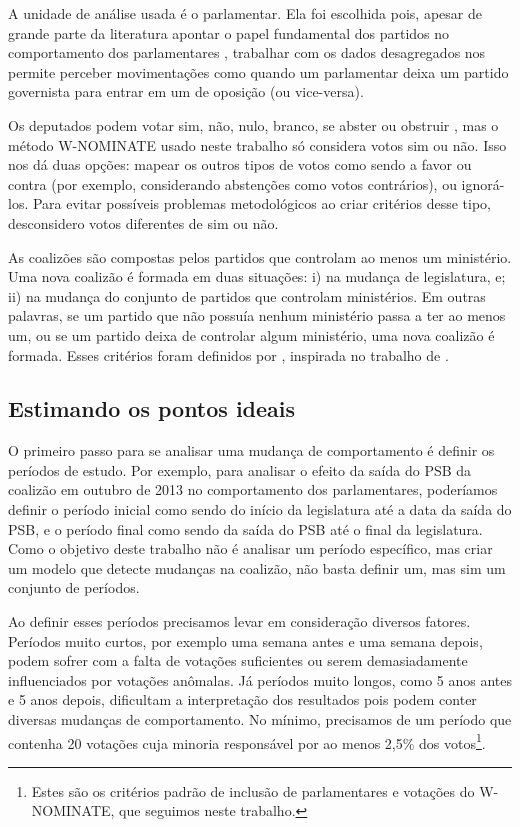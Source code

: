 \documentclass[a4paper,titlepage]{ppgi}\usepackage[]{graphicx}\usepackage[]{color}
\begin{document}
A unidade de análise usada é o parlamentar. Ela foi escolhida pois, apesar de
grande parte da literatura apontar o papel fundamental dos partidos no
comportamento dos parlamentares \cite{Figueiredo2001,Santos2003}, trabalhar com
os dados desagregados nos permite perceber movimentações como quando um
parlamentar deixa um partido governista para entrar em um de oposição (ou
vice-versa).


Os deputados podem votar sim, não, nulo, branco, se abster ou obstruir
\cite{Carneiro2013}, mas o método W-NOMINATE usado neste trabalho só considera
votos sim ou não. Isso nos dá duas opções: mapear os outros tipos de votos como
sendo a favor ou contra (por exemplo, considerando abstenções como votos
contrários), ou ignorá-los. Para evitar possíveis problemas metodológicos ao
criar critérios desse tipo, desconsidero votos diferentes de sim ou não.


As coalizões são compostas pelos partidos que controlam ao menos um ministério.
Uma nova coalizão é formada em duas situações: i) na mudança de legislatura, e;
ii) na mudança do conjunto de partidos que controlam ministérios. Em outras
palavras, se um partido que não possuía nenhum ministério passa a ter ao menos
um, ou se um partido deixa de controlar algum ministério, uma nova coalizão é
formada. Esses critérios foram definidos por ,
inspirada no trabalho de .


\subsection{Estimando os pontos ideais}

O primeiro passo para se analisar uma mudança de comportamento é definir os
períodos de estudo. Por exemplo, para analisar o efeito da saída do PSB da
coalizão em outubro de 2013 no comportamento dos parlamentares, poderíamos
definir o período inicial como sendo do início da legislatura até a data da
saída do PSB, e o período final como sendo da saída do PSB até o final da
legislatura. Como o objetivo deste trabalho não é analisar um período
específico, mas criar um modelo que detecte mudanças na coalizão, não basta
definir um, mas sim um conjunto de períodos.

Ao definir esses períodos precisamos levar em consideração diversos fatores.
Períodos muito curtos, por exemplo uma semana antes e uma semana depois, podem
sofrer com a falta de votações suficientes ou serem demasiadamente
influenciados por votações anômalas. Já períodos muito longos, como 5 anos
antes e 5 anos depois, dificultam a interpretação dos resultados pois podem
conter diversas mudanças de comportamento. No mínimo, precisamos de um período
que contenha 20 votações cuja minoria responsável por ao menos 2,5\% dos
votos\footnote{Estes são os critérios padrão de inclusão de parlamentares e
votações do W-NOMINATE, que seguimos neste trabalho.}.
\end{document}
